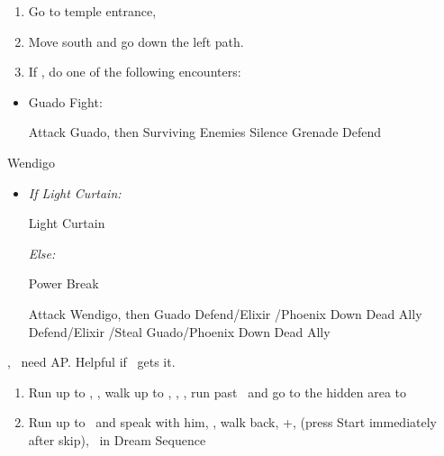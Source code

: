 \begin{enumerate}[resume]
	\item Go to temple entrance, \sd
	\item Move south and go down the left path.
	\item If \blitzloss, do one of the following encounters:
\end{enumerate}
\begin{encounters}
	\begin{itemize}
		\item Guado Fight:
		      \begin{itemize}
			      \tidusf Attack Guado, then Surviving Enemies
			      \rikkuf Silence Grenade
			      \yunaf Defend
		      \end{itemize}
	\end{itemize}
\end{encounters}
\vfill
\begin{battle}[18000]{Wendigo}
	\begin{itemize}
		\tidusf Haste \tidus
		\tidusf Switch Weapon to Brotherhood
		\tidusf Attack Guado B (Top One)
		\item \textit{If Light Curtain:}
		      \begin{itemize}
			      \rikkuf Light Curtain \tidus
		      \end{itemize}
		      \textit{Else:}
		      \begin{itemize}
			      \switch{\rikku}{\auron}
			      \auronf Power Break
		      \end{itemize}
		      \tidusf Attack Wendigo, then Guado
		      \yunaf Defend/Elixir \tidus/Phoenix Down Dead Ally
		      \rikkuf Defend/Elixir \tidus/Steal Guado/Phoenix Down Dead Ally
		      \switch{\yuna}{\lulu}
	\end{itemize}
	\yuna, \tidus\ need AP. Helpful if \lulu\ gets it.
\end{battle}
\begin{enumerate}[resume]
	\item Run up to \rikku, \sd, walk up to \yuna, \sd, \save, run past \kimahri\ and go to the hidden area to 
	\item Run up to \auron\ and speak with him, \sd, walk back, \cs+\skippablefmv[1:00], (press Start immediately after skip), \sd\ in Dream Sequence
\end{enumerate}